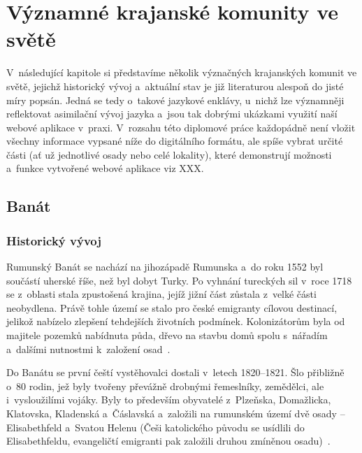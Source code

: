 \hypertarget{vuxfdznamnuxe9-krajanskuxe9-komunity-ve-svux11btux11b}{%
\chapter{Významné krajanské komunity ve světě}\label{vuxfdznamnuxe9-krajanskuxe9-komunity-ve-svux11btux11b}}

V~následující kapitole si představíme několik význačných krajanských komunit ve světě, jejichž historický vývoj a~aktuální stav je již literaturou alespoň do jisté míry popsán. Jedná se tedy o~takové jazykové enklávy, u~nichž lze významněji reflektovat asimilační vývoj jazyka a~jsou tak dobrými ukázkami využití naší webové aplikace v~praxi. V~rozsahu této diplomové práce každopádně není vložit všechny informace vypsané níže do digitálního formátu, ale spíše vybrat určité části (ať už jednotlivé osady nebo celé lokality), které demonstrují možnosti a~funkce vytvořené webové aplikace viz XXX.

\hypertarget{banuxe1t}{%
\section{Banát}\label{banuxe1t}}

\hypertarget{historickuxfd-vuxfdvoj}{%
\subsection*{Historický vývoj}\label{historickuxfd-vuxfdvoj}}

Rumunský Banát se nachází na jihozápadě Rumunska a~do roku 1552 byl součástí uherské říše, než byl dobyt Turky. Po vyhnání tureckých sil v~roce 1718 se z~oblasti stala zpustošená krajina, jejíž jižní část zůstala z~velké části neobydlena. Právě tohle území se stalo pro české emigranty cílovou destinací, jelikož nabízelo zlepšení tehdejších životních podmínek. Kolonizátorům byla od majitele pozemků nabídnuta půda, dřevo na stavbu domů spolu s~nářadím a~dalšími nutnostmi k~založení osad~\parencite{Secka1995}.

Do Banátu se první čeští vystěhovalci dostali v~letech 1820--1821. Šlo přibližně o~80 rodin, jež byly tvořeny převážně drobnými řemeslníky, zemědělci, ale i~vysloužilími vojáky. Byly to především obyvatelé z~Plzeňska, Domažlicka, Klatovska, Kladenská a~Čáslavská a~založili na rumunském území dvě osady -- Elisabethfeld a~Svatou Helenu (Češi katolického původu se usídlili do Elisabethfeldu, evangeličtí emigranti pak založili druhou zmíněnou osadu)~\parencite{Gecse2013}.

